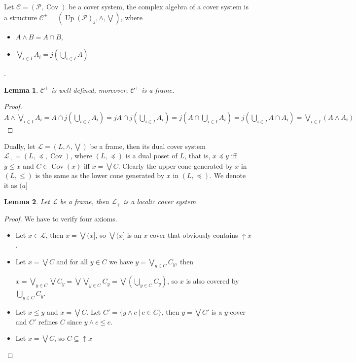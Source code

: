 \documentclass[a4paper]{article}
\theoremstyle{defin}
\theoremstyle{theorem}
\theoremstyle{claim}
\theoremstyle{prop}
\theoremstyle{lemma}
\newtheorem{lemma}{Lemma}
\theoremstyle{fact}
\theoremstyle{ex}
\theoremstyle{col}
\begin{document}
Let $\mathcal{C} = (\mathcal{P}, \operatorname{Cov})$ be a cover system, the complex algebra of a cover system is a structure $\mathcal{C}^{+} = (\operatorname{Up}(\mathcal{P})_j, \wedge, \bigvee)$, where
\begin{itemize}
\item $A \wedge B = A \cap B$,
\item $\bigvee \limits_{i \in I} A_i = j(\bigcup \limits_{i \in I} A)$
\end{itemize}.

\begin{lemma}
$\mathcal{C}^{+}$ is well-defined, moreover, $\mathcal{C}^{+}$ is a frame.
\end{lemma}

\begin{proof}
$A \wedge \bigvee \limits_{i \in I} A_i = A \cap j (\bigcup \limits_{i \in I} A_i) = j A \cap j (\bigcup \limits_{i \in I} A_i) = j (A \cap \bigcup \limits_{i \in I} A_i) = j (\bigcup \limits_{i \in I} A \cap A_i) = \bigvee \limits_{i \in I} (A \wedge A_i)$
\end{proof}

Dually, let $\mathcal{L} = (L, \wedge, \bigvee)$ be a frame, then its dual cover system $\mathcal{L}_+ = (L, \preceq, \operatorname{Cov})$, where $(L, \preceq)$ is a dual poset of $L$, that is, $x \preceq y$ iff $y \leq x$ and $C \in \operatorname{Cov}(x)$ iff $x = \bigvee C$. Clearly the upper cone generated by $x$ in $(L, \leq)$ is the same as the lower cone generated by $x$ in $(L, \preceq)$. We denote it as $(a]$

\begin{lemma} Let $\mathcal{L}$ be a frame, then $\mathcal{L}_+$ is a localic cover system
\end{lemma}
\begin{proof}
We have to verify four axioms.

\begin{itemize}
\item Let $x \in \mathcal{L}$, then $x = \bigvee (x]$, so $\bigvee (x]$ is an $x$-cover that obviously contains $\uparrow x$.
\item Let $x = \bigvee C$ and for all $y \in C$ we have $y = \bigvee \limits_{y \in C} C_y$, then
\begin{center}
$x = \bigvee \limits_{y \in C} \bigvee C_y = \bigvee \bigvee \limits_{y \in C} C_y = \bigvee (\bigcup \limits_{y \in C} C_y)$, so $x$ is also covered by $\bigcup \limits_{y \in C} C_y$.
\end{center}
\item Let $x \leq y$ and $x = \bigvee C$. Let $C' = \{ y \wedge c \: | \: c \in C \}$, then $y = \bigvee C'$ is a $y$-cover and $C'$ refines $C$ since $y \wedge c \leq c$.
\item Let $x = \bigvee C$, so $C \subseteq \uparrow x$
\end{itemize}
\end{proof}
\end{document}
